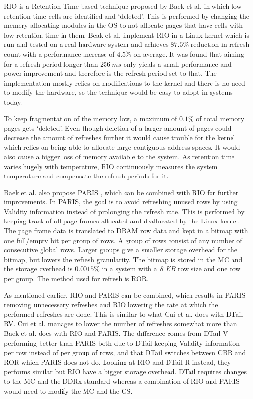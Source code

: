 RIO is a Retention Time based technique proposed by Baek et al. \cite{rioparis} in which low retention time cells are identified and `deleted'. This is performed by changing the memory allocating modules in the OS to not allocate pages that have cells with low retention time in them. Beak et al. implement RIO in a Linux kernel which is run and tested on a real hardware system and achieves $87.5\%$ reduction in refresh count with a performance increase of $4.5\%$ on average. It was found that aiming for a refresh period longer than $256~ms$ only yields a small performance and power improvement and therefore is the refresh period set to that. The implementation mostly relies on modifications to the kernel and there is no need to modify the hardware, so the technique would be easy to adopt in systems today. 

To keep fragmentation of the memory low, a maximum of $0.1\%$ of total memory pages gets `deleted'. Even though deletion of a larger amount of pages could decrease the amount of refreshes further it would cause trouble for the kernel which relies on being able to allocate large contiguous address spaces. It would also cause a bigger loss of memory available to the system. As retention time varies hugely with temperature, RIO continuously measures the system temperature and compensate the refresh periods for it. 

Baek et al. also propose PARIS \cite{rioparis}, which can be combined with RIO for further improvements. In PARIS, the goal is to avoid refreshing unused rows by using Validity information instead of prolonging the refresh rate. This is performed by keeping track of all page frames allocated and deallocated by the Linux kernel. The page frame data is translated to DRAM row data and kept in a bitmap with one full/empty bit per group of rows. A group of rows consist of any number of consecutive global rows. Larger groups give a smaller storage overhead for the bitmap, but lowers the refresh granularity. The bitmap is stored in the MC and the storage overhead is $0.0015\%$ in a system with a \textit{8 KB} row size and one row per group. The method used for refresh is ROR. 

As mentioned earlier, RIO and PARIS can be combined, which results in PARIS removing unnecessary refreshes and RIO lowering the rate at which the performed refreshes are done. This is similar to what Cui et al. does with DTail-RV. Cui et al. manages to lower the number of refreshes somewhat more than Baek et al. does with RIO and PARIS. The difference comes from DTail-V performing better than PARIS both due to DTail keeping Validity information per row instead of per group of rows, and that DTail switches between CBR and ROR which PARIS does not do. Looking at RIO and DTail-R instead, they performs similar but RIO have a bigger storage overhead. DTail requires changes to the MC and the DDRx standard whereas a combination of RIO and PARIS would need to modify the MC and the OS. 
